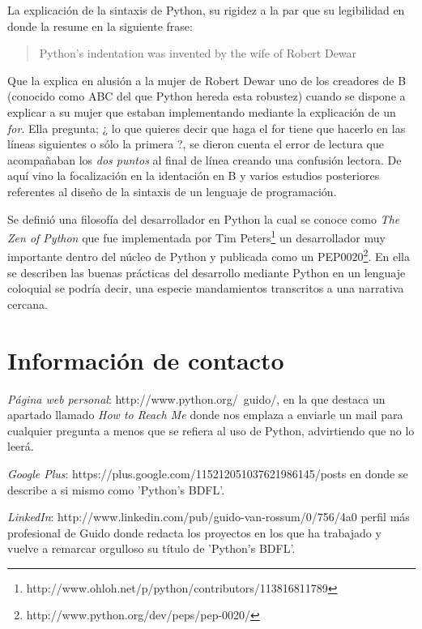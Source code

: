 \documentclass[11pt]{scrartcl}
\begin{document}
La explicación de la sintaxis de Python, su rigidez a la par que su legibilidad en donde la resume en la siguiente frase:

\begin{quote}Python's indentation was invented by the wife of Robert Dewar\end{quote}

Que la explica en alusión a la mujer de Robert Dewar uno de los creadores de B (conocido como ABC del que Python hereda esta robustez) cuando se dispone a explicar a su mujer que estaban implementando mediante la explicación de un \emph{for}. Ella pregunta; ¿ lo que quieres decir que haga el for tiene que hacerlo en las líneas siguientes o sólo la primera ?, se dieron cuenta el error de lectura que acompañaban los \emph{dos puntos} al final de línea creando una confusión lectora. De aquí vino la focalización en la identación en B y varios estudios posteriores referentes al diseño de la sintaxis de un lenguaje de programación.

Se definió una filosofía del desarrollador en Python la cual se conoce como \emph{The Zen of Python} que fue implementada por Tim Peters\footnote{http://www.ohloh.net/p/python/contributors/113816811789} un desarrollador muy importante dentro del núcleo de Python y publicada como un PEP0020\footnote{http://www.python.org/dev/peps/pep-0020/}. En ella se describen las buenas prácticas del desarrollo mediante Python en un lenguaje coloquial se podría decir, una especie mandamientos transcritos a una narrativa cercana.

\section{Información de contacto}\label{sec:contactinfo}

\emph{Página web personal}: http://www.python.org/~guido/, en la que destaca un apartado llamado \emph{How to Reach Me} donde nos emplaza a enviarle un mail para cualquier pregunta a menos que se refiera al uso de Python, advirtiendo que no lo leerá.

\emph{Google Plus}: https://plus.google.com/115212051037621986145/posts en donde se describe a si mismo como 'Python's BDFL'.

\emph{LinkedIn}: http://www.linkedin.com/pub/guido-van-rossum/0/756/4a0 perfil más profesional de Guido donde redacta los proyectos en los que ha trabajado y vuelve a remarcar orgulloso su título de 'Python's BDFL'.
\end{document}
